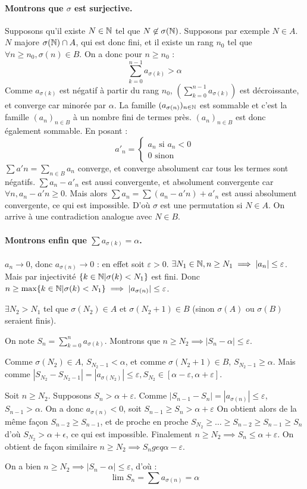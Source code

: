 \paragraph{Montrons que $\sigma$ est surjective.} Supposons qu'il existe $N\in \mathbb{N}$ tel que $N\not \in \sigma(\mathbb{N})$. Supposons par exemple $N\in A$. $N$ majore $\sigma(\mathbb{N}) \cap A$, qui est donc fini, et il existe un rang $n_0$ tel que $\forall n \geq n_0, \sigma(n)\in B$. On a donc pour $n\geq n_0$ :
$$\sum_{k=0}^{n-1} a_{\sigma(k)} > \alpha$$
Comme $a_{\sigma(k)}$ est négatif à partir du rang $n_0$, $(\sum_{k=0}^{n-1} a_{\sigma(k)})$ est décroissante, et converge car minorée par $\alpha$. La famille $(a_{\sigma(n)})_{n\in \mathbb{N}}$ est sommable et c'est la famille $(a_n)_{n\in B}$ à un nombre fini de termes près. $(a_n)_{n\in B}$ est donc également sommable. En posant :
$$a'_n=\begin{cases}
    a_n \text{ si } a_n<0 \\
    0 \text{ sinon}
\end{cases}$$
$\sum a'n = \sum_{n\in B} a_n$ converge, et converge absolument car tous les termes sont négatifs.
$\sum a_n-a'_n$ est aussi convergente, et absolument convergente car $\forall n, a_n-a'n\geq 0$. Mais alors $\sum a_n = \sum (a_n-a'n)+a'_n$ est aussi absolument convergente, ce qui est impossible. D'où $\sigma$ est une permutation si $N\in A$. On arrive à une contradiction analogue avec $N\in B$. 

\paragraph{Montrons enfin que $\sum a_{\sigma(k)}=\alpha$.} $a_n \to 0$, donc $a_{\sigma(n)} \to 0$ : en effet soit $\varepsilon >0$. $\exists N_1 \in \mathbb{N}, n \geq N_1 \implies |a_n|\leq \varepsilon$. Mais par injectivité $\{k\in \mathbb{N} |\sigma(k)<N_1\}$ est fini. Donc $n\geq \max \{k\in \mathbb{N} |\sigma(k)<N_1\} \implies |a_{\sigma(n)}|\leq \varepsilon$.

$\exists N_2 > N_1$ tel que $\sigma(N_2) \in A$ et $\sigma(N_2+1) \in B$ (sinon $\sigma(A)$ ou $\sigma(B)$ seraient finis).

On note $S_n=\sum_{k=0}^n a_{\sigma(k)}$. Montrons que $n\geq N_2 \implies |S_n - \alpha|\leq \varepsilon$.

Comme $\sigma(N_2) \in A$, $S_{N_2-1} < \alpha$, et comme $\sigma(N_2+1) \in B$, $S_{N_2-1} \geq \alpha$. Mais comme $|S_{N_2}-S_{N_2-1}|=|a_{\sigma(N_2)}|\leq \varepsilon, S_{N_2} \in [\alpha-\varepsilon, \alpha+\varepsilon]$.

Soit $n\geq N_2$. Supposons $S_n > \alpha+\varepsilon$. Comme $|S_{n-1}-S_n|=|a_{\sigma(n)}|\leq \varepsilon$, $S_{n-1} > \alpha$. On a donc $a_{\sigma(n)} < 0$, soit $S_{n-1} \geq S_n > \alpha+\varepsilon$ On obtient alors de la même façon $S_{n-2} \geq S_{n-1}$, et de proche en proche $S_{N_2} \geq \dots \geq S_{n-2} \geq S_{n-1} \geq S_n$ d'où $S_{N_2} > \alpha + \epsilon$, ce qui est impossible. Finalement $n\geq N_2 \implies S_n \leq \alpha +\varepsilon$. On obtient de façon similaire $n\geq N_2 \implies S_n geq \alpha -\varepsilon$.

On a bien $n\geq N_2 \implies |S_n-\alpha| \leq \varepsilon$, d'où :
$$\boxed{\lim S_n = \sum a_{\sigma(n)} = \alpha}$$